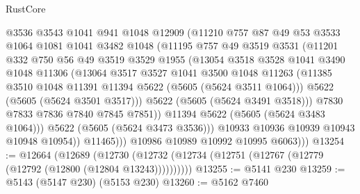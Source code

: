 \begin{lexlean}{RustCore}
\begin{coremodule}
                      @3536
                      @3543
                      @1041
                      @941
                      @1048
                      @12909
                      (@11210
                        @757
                        @87
                        @49
                        @53
                        @3533
                        @1064
                        @1081
                        @1041
                        @3482
                        @1048
                        (@11195
                          @757
                          @49
                          @3519
                          @3531
                          (@11201
                            @332
                            @750
                            @56
                            @49
                            @3519
                            @3529
                            @1955
                            (@13054
                              @3518
                              @3528
                              @1041
                              @3490
                              @1048
                              @11306
                              (@13064
                                @3517
                                @3527
                                @1041
                                @3500
                                @1048
                                @11263
                                (@11385 @3510 @1048 @11391 @11394 @5622 (@5605 (@5624 @3511 @1064)))
                                @5622
                                (@5605 (@5624 @3501 @3517)))
                              @5622
                              (@5605 (@5624 @3491 @3518)))
                            @7830
                            @7833
                            @7836
                            @7840
                            @7845
                            @7851))
                        @11394
                        @5622
                        (@5605 (@5624 @3483 @1064)))
                      @5622
                      (@5605 (@5624 @3473 @3536)))
                    @10933
                    @10936
                    @10939
                    @10943
                    @10948
                    @10954))
                @11465)))
          @10986
          @10989
          @10992
          @10995
          @6063)))
@13254 := @12664
    (@12689 (@12730 (@12732 (@12734 (@12751 (@12767 (@12779 (@12792 (@12800 (@12804 @13243))))))))))
@13255 := @5141 @230
@13259 := @5143 (@5147 @230) (@5153 @230)
@13260 := @5162 @7460

\end{coremodule}
\end{lexlean}

